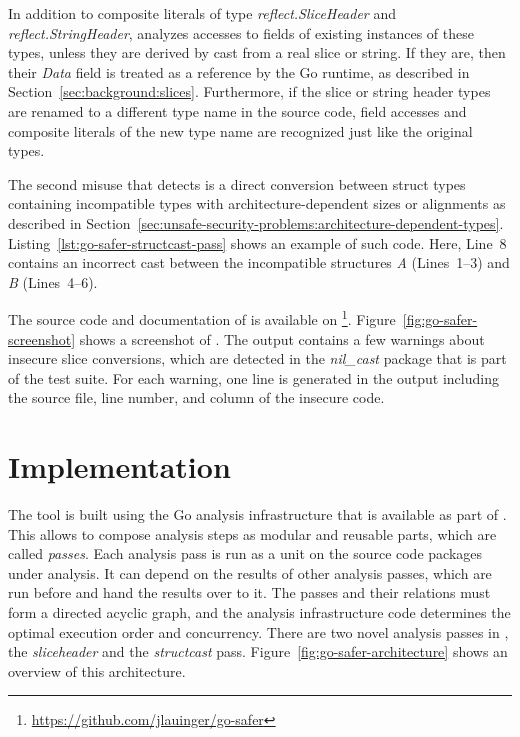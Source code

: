 

In addition to composite literals of type \textit{reflect.SliceHeader} and \textit{reflect.StringHeader}, \toolSafer{}
analyzes accesses to fields of existing instances of these types, unless they are derived by cast from a real slice or
string.
If they are, then their \textit{Data} field is treated as a reference by the Go runtime, as described in
Section~\ref{sec:background:slices}.
Furthermore, if the slice or string header types are renamed to a different type name in the source code, field accesses
and composite literals of the new type name are recognized just like the original types.

The second misuse that \toolSafer{} detects is a direct conversion between struct types containing incompatible types
with architecture-dependent sizes or alignments as described in
Section~\ref{sec:unsafe-security-problems:architecture-dependent-types}.
Listing~\ref{lst:go-safer-structcast-pass} shows an example of such code.
Here, Line~8 contains an incorrect cast between the incompatible structures \textit{A} (Lines~1--3) and \textit{B}
(Lines~4--6).



The source code and documentation of \toolSafer{} is available on
\github{}\footnote{\url{https://github.com/jlauinger/go-safer}}.
Figure~\ref{fig:go-safer-screenshot} shows a screenshot of \toolSafer{}.
The output contains a few warnings about insecure slice conversions, which are detected in the \textit{nil\_cast}
package that is part of the \toolSafer{} test suite.
For each warning, one line is generated in the output including the source file, line number, and column of the insecure
code.





\section{Implementation}\label{sec:go-safer:implementation}

The \toolSafer{} tool is built using the Go analysis infrastructure that is available as part of \toolVet{}.
This allows to compose analysis steps as modular and reusable parts, which are called \textit{passes}.
Each analysis pass is run as a unit on the source code packages under analysis.
It can depend on the results of other analysis passes, which are run before and hand the results over to it.
The passes and their relations must form a directed acyclic graph, and the analysis infrastructure code determines the
optimal execution order and concurrency.
There are two novel analysis passes in \toolSafer{}, the \textit{sliceheader} and the \textit{structcast} pass.
Figure~\ref{fig:go-safer-architecture} shows an overview of this architecture.

